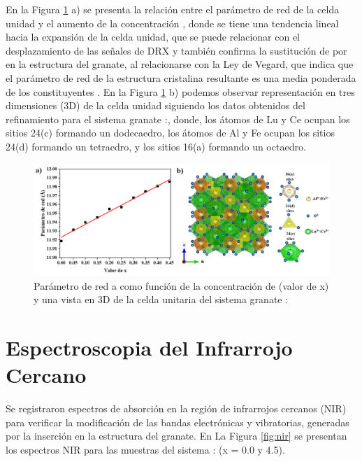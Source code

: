 En la Figura \ref{fig:para} a) se presenta la relación entre el parámetro de
red de la
celda unidad y el aumento de la concentración , donde se tiene una
tendencia lineal hacia la expansión de la celda unidad, que se puede relacionar
con el desplazamiento de las señales de DRX y también confirma la sustitución
de  por  en la estructura del granate, al relacionarse
con la Ley de Vegard, que indica que el parámetro de red de la estructura
cristalina
resultante es una media ponderada de los constituyentes \cite{Kempter1966,King1921}. En la Figura
\ref{fig:para}
b) podemos observar representación en tres dimensiones (3D) de la celda unidad
siguiendo
los datos obtenidos del refinamiento para el sistema granate
:, donde, los átomos de Lu y Ce ocupan los
sitios 24(c) formando un dodecaedro, los átomos de Al y Fe ocupan los sitios
24(d) formando un tetraedro, y los sitios 16(a) formando un octaedro.\\

\begin{figure}[h]
    \centering%

    \includegraphics[width=\textwidth]{Kap3/ParametroRed.png}%
    \caption{Parámetro de red a como función de la concentración de
    (valor de x) y una vista en 3D de la celda unitaria del sistema granate
    :}
    \label{fig:para}
\end{figure}

\section{Espectroscopia del Infrarrojo Cercano}

Se registraron espectros de absorción en la región de infrarrojos cercanos
(NIR) para verificar la modificación de las bandas electrónicas y vibratorias,
generadas por la inserción  en la estructura del granate. En La
Figura \ref{fig:nir} se presentan los espectros NIR para las muestras del
sistema
: (x = 0.0 y 4.5).\\


